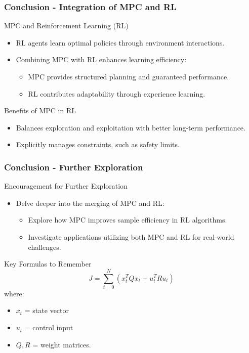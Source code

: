 \documentclass[aspectratio=169]{beamer}
\begin{document}
\begin{frame}[fragile]
    \frametitle{Conclusion - Integration of MPC and RL}
    \begin{block}{MPC and Reinforcement Learning (RL)}
        \begin{itemize}
            \item RL agents learn optimal policies through environment interactions.
            \item Combining MPC with RL enhances learning efficiency:
                \begin{itemize}
                    \item MPC provides structured planning and guaranteed performance.
                    \item RL contributes adaptability through experience learning.
                \end{itemize}
        \end{itemize}
    \end{block}

    \begin{block}{Benefits of MPC in RL}
        \begin{itemize}
            \item Balances exploration and exploitation with better long-term performance.
            \item Explicitly manages constraints, such as safety limits.
        \end{itemize}
    \end{block}
\end{frame}

\begin{frame}[fragile]
    \frametitle{Conclusion - Further Exploration}
    \begin{block}{Encouragement for Further Exploration}
        \begin{itemize}
            \item Delve deeper into the merging of MPC and RL:
                \begin{itemize}
                    \item Explore how MPC improves sample efficiency in RL algorithms.
                    \item Investigate applications utilizing both MPC and RL for real-world challenges.
                \end{itemize}
        \end{itemize}
    \end{block}

    \begin{block}{Key Formulas to Remember}
        \begin{equation}
            J = \sum_{t=0}^{N} \left( x_t^T Q x_t + u_t^T R u_t \right)
        \end{equation}
        where:
        \begin{itemize}
            \item \( x_t \) = state vector
            \item \( u_t \) = control input
            \item \( Q, R \) = weight matrices.
        \end{itemize}
    \end{block}
\end{frame}
\end{document}
